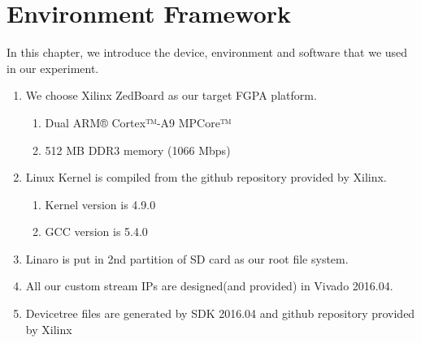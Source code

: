 \chapter{Environment Framework}
\label{cha:Environment Framework}

In this chapter, we introduce the device, environment and software that we used in our experiment. 



\begin{enumerate}[label=(\roman*)]
\item We choose Xilinx ZedBoard as our target FGPA platform.
	\begin{enumerate}
	\item Dual ARM® Cortex™-A9 MPCore™
	\item 512 MB DDR3 memory (1066 Mbps)
	\end{enumerate}
\item Linux Kernel is compiled from the github repository provided by Xilinx.\cite{xlnxkernel}
	\begin{enumerate}
	\item Kernel version is 4.9.0
	\item GCC version is 5.4.0
	\end{enumerate}
\item Linaro\cite{linarofs} is put in 2nd partition of SD card as our root file system.
\item All our custom stream IPs are designed(and provided) in Vivado 2016.04.
\item Devicetree files are generated by SDK 2016.04 and github repository provided by Xilinx\cite{xlnxdevicetree}
\end{enumerate}

